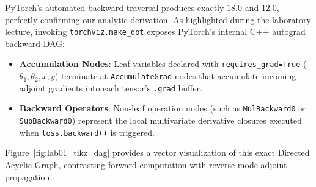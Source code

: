 \documentclass[../labs.tex]{subfiles}
\begin{document}
PyTorch's automated backward traversal produces exactly $18.0$ and $12.0$, perfectly confirming our analytic derivation. As highlighted during the laboratory lecture, invoking \texttt{torchviz.make\_dot} exposes PyTorch's internal C++ autograd backward DAG:
\begin{itemize}
    \item \textbf{Accumulation Nodes}: Leaf variables declared with \texttt{requires\_grad=True} ($\theta_1, \theta_2, x, y$) terminate at \texttt{AccumulateGrad} nodes that accumulate incoming adjoint gradients into each tensor's \texttt{.grad} buffer.
    \item \textbf{Backward Operators}: Non-leaf operation nodes (such as \texttt{MulBackward0} or \texttt{SubBackward0}) represent the local multivariate derivative closures executed when \texttt{loss.backward()} is triggered.
\end{itemize}
Figure~\ref{fig:lab01_tikz_dag} provides a vector visualization of this exact Directed Acyclic Graph, contrasting forward computation with reverse-mode adjoint propagation.
\end{document}
